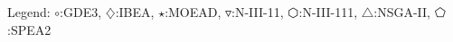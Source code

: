 Legend: {\color{NavyBlue}$\circ$}:GDE3, {\color{Magenta}$\diamondsuit$}:IBEA, {\color{Orange}$\star$}:MOEAD, {\color{CornflowerBlue}$\triangledown$}:N-III-11, {\color{red}$\varhexagon$}:N-III-111, {\color{YellowGreen}$\triangle$}:NSGA-II, {\color{cyan}$\pentagon$}:SPEA2